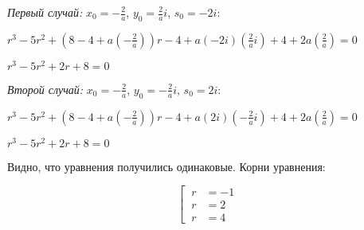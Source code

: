 \vspace{1mm}
\textit{Первый случай:} $ x_0 = -\frac{2}{a} $, $ y_0 = \frac{2}{a}i $, $ s_0 = -2i $:
\vspace{2mm}

$ r^3 - 5r^2 + (8 - 4 + a(-\frac{2}{a}))r - 4 + a(-2i)(\frac{2}{a}i) + 4 + 2a(\frac{2}{a}) = 0 $

$ r^3 - 5r^2 + 2r + 8 = 0 $

\vspace{1mm}
\textit{Второй случай:} $ x_0 = -\frac{2}{a} $, $ y_0 = -\frac{2}{a}i $, $ s_0 = 2i $:
\vspace{2mm}

$ r^3 - 5r^2 + (8 - 4 + a(-\frac{2}{a}))r - 4 + a(2i)(-\frac{2}{a}i) + 4 + 2a(\frac{2}{a}) = 0 $

$ r^3 - 5r^2 + 2r + 8 = 0 $

\vspace{1mm}

Видно, что уравнения получились одинаковые. Корни уравнения:

$$
	\left[\
		\begin{aligned}
			r &= - 1 \\
			r &= 2 \\
			r &= 4
		\end{aligned}
	\right.
$$



